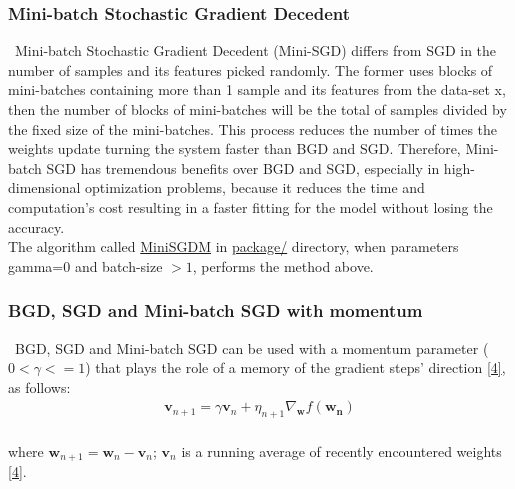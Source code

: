 \subsubsection{Mini-batch Stochastic Gradient Decedent}
\label{chap:Mini-batch Stochastic Gradient Decedent}

\qquad \, Mini-batch Stochastic Gradient Decedent (Mini-SGD) differs from SGD in the number of samples and its features picked randomly. The former uses blocks of mini-batches containing more than 1 sample and its features from the data-set x, then the number of blocks of mini-batches will be the total of samples divided by the fixed size of the mini-batches. This process reduces the number of times the weights update turning the system faster than BGD and SGD. Therefore, Mini-batch SGD has tremendous benefits over BGD and SGD, especially in high-dimensional optimization problems, because it reduces the time and computation's cost resulting in a faster fitting for the model without losing the accuracy.\\

The algorithm called \href{https://github.com/fabiorodp/UiO-FYS-STK4155/blob/master/Project2/package/gradient_descent.py}{MiniSGDM} in \href{https://github.com/fabiorodp/UiO-FYS-STK4155/blob/master/Project2/package/}{package/} directory, when parameters gamma=0 and batch-size $> 1$, performs the method above.\\

\subsubsection{BGD, SGD and Mini-batch SGD with momentum}
\label{chap:BGD, SGD and Mini-batch SGD with momentum}

\qquad \, BGD, SGD and Mini-batch SGD can be used with a momentum parameter ($0 < \gamma <= 1$) that plays the role of a memory of the gradient steps' direction \hyperref[Bib:Week40Notes]{[4]}, as follows:\\

\begin{align*}
\boldsymbol{v}_{n+1} = \gamma \boldsymbol{v}_{n} + \eta_{n+1} \nabla_{\boldsymbol{w}} f(\boldsymbol{w_{n}})
\end{align*}\\

\noindent where $\boldsymbol{w}_{n+1} = \boldsymbol{w}_{n} - \boldsymbol{v}_{n}$; $\boldsymbol{v}_{n}$ is a running average of recently encountered weights \hyperref[Bib:Week40Notes]{[4]}.\\

